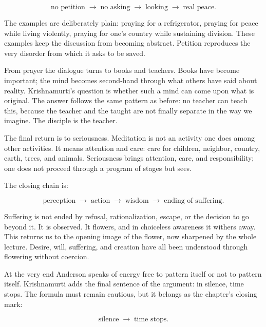 \begin{equation}
\text{no petition}
\;\longrightarrow\;
\text{no asking}
\;\longrightarrow\;
\text{looking}
\;\longrightarrow\;
\text{real peace}.
\end{equation}

The examples are deliberately plain: praying for a refrigerator, praying for peace while living violently, praying for one's country while sustaining division. These examples keep the discussion from becoming abstract. Petition reproduces the very disorder from which it asks to be saved.

From prayer the dialogue turns to books and teachers. Books have become important; the mind becomes second-hand through what others have said about reality. Krishnamurti's question is whether such a mind can come upon what is original. The answer follows the same pattern as before: no teacher can teach this, because the teacher and the taught are not finally separate in the way we imagine. The disciple is the teacher.

The final return is to seriousness. Meditation is not an activity one does among other activities. It means attention and care: care for children, neighbor, country, earth, trees, and animals. Seriousness brings attention, care, and responsibility; one does not proceed through a program of stages but sees.

The closing chain is:

\begin{equation}
\text{perception}
\;\longrightarrow\;
\text{action}
\;\longrightarrow\;
\text{wisdom}
\;\longrightarrow\;
\text{ending of suffering}.
\end{equation}

Suffering is not ended by refusal, rationalization, escape, or the decision to go beyond it. It is observed. It flowers, and in choiceless awareness it withers away. This returns us to the opening image of the flower, now sharpened by the whole lecture. Desire, will, suffering, and creation have all been understood through flowering without coercion.

At the very end Anderson speaks of energy free to pattern itself or not to pattern itself. Krishnamurti adds the final sentence of the argument: in silence, time stops. The formula must remain cautious, but it belongs as the chapter's closing mark:

\begin{equation}
\text{silence}
\;\longrightarrow\;
\text{time stops}.
\end{equation}

